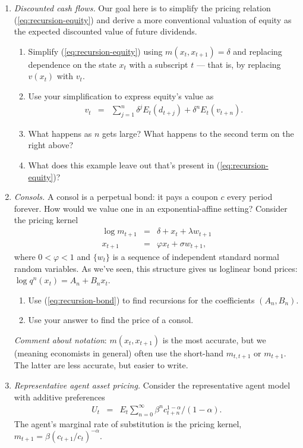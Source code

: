 \documentclass[11pt]{article}
\begin{document}
\begin{enumerate}
\item {\it Discounted cash flows.\/}
Our goal here is to simplify the pricing relation (\ref{eq:recursion-equity})
and derive a more conventional valuation of equity 
as the expected discounted value of future dividends.  
\begin{enumerate}
\item Simplify (\ref{eq:recursion-equity}) using $ m(x_t,x_{t+1}) = \delta $
and replacing dependence on the state $x_t$ with a subscript $t$ ---
that is, by replacing $v(x_t)$ with $v_t$.  
\item Use your simplification to express equity's value as 
\begin{eqnarray*}
    v_t &=& \sum_{j=1}^n \delta^j E_t (d_{t+j}) + \delta^n E_t (v_{t+n}) .
\end{eqnarray*}
\item What happens as $n$ gets large?  
What happens to the second term on the right above?
\item What does this example leave out that's present in (\ref{eq:recursion-equity})?
\end{enumerate} 

\item {\it Consols.\/}
A consol is a perpetual bond:  it pays a coupon $c$ every period forever.  
How would we value one in an exponential-affine setting?  
Consider the pricing kernel 
\begin{eqnarray*}
    \log m_{t+1} &=& \delta + x_t + \lambda w_{t+1} \\
    x_{t+1} &=& \varphi x_t + \sigma w_{t+1} ,
\end{eqnarray*}
where $ 0 < \varphi < 1$ and $\{ w_t\} $ is a sequence
of independent standard normal random variables.  
As we've seen, this structure gives us loglinear 
bond prices:  
$ \log q^n(x_t) = A_n + B_n x_t $. 
%
\begin{enumerate}
\item Use (\ref{eq:recursion-bond}) to find recursions for the coefficients
$(A_n,B_n)$.
\item Use your answer to find the price of a consol.
\end{enumerate}
{\it Comment about notation\/}:  $m(x_t,x_{t+1})$ is the most accurate,
but we (meaning economists in general) often use the
short-hand $m_{t,t+1}$ or $m_{t+1}$.
The latter are less accurate, but easier to write.



\item {\it Representative agent asset pricing.\/}
Consider the representative agent model with additive preferences 
\begin{eqnarray*}
    U_t &=& E_t \sum_{n=0}^\infty \beta^n c_{t+n}^{1-\alpha} /(1-\alpha) .
\end{eqnarray*}
The agent's marginal rate of substitution is the pricing kernel, 
 $ m_{t+1} = \beta (c_{t+1}/c_t)^{-\alpha} $.  
 

\end{enumerate}
\end{document}
